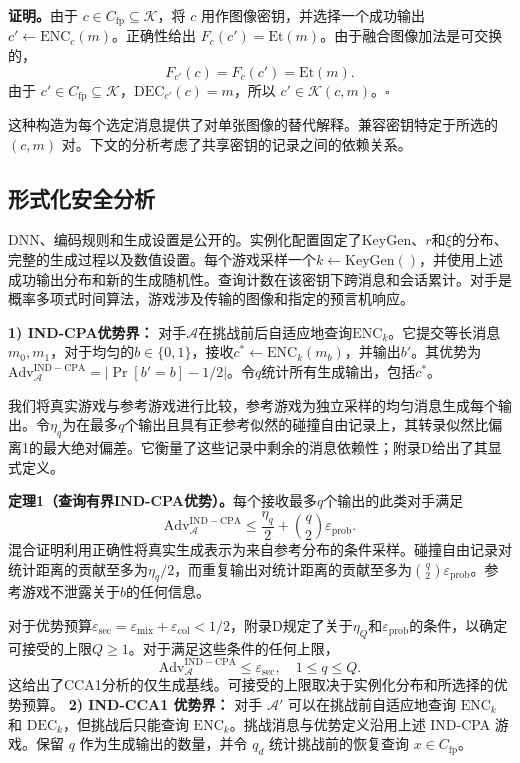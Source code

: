 \documentclass[UTF8,a4paper,zihao=-4,fontset=windows,openany]{ctexbook}
\begin{document}
\textbf{证明。}由于 \(c \in C_{\mathrm{fp}} \subseteq \mathcal{K}\)，将 \(c\) 用作图像密钥，并选择一个成功输出 \(c' \leftarrow \mathrm{ENC}_c(m)\)。正确性给出 \(F_c(c') = \mathrm{Et}(m)\)。由于融合图像加法是可交换的，
\begin{equation}
F_{c'}(c) = F_c(c') = \mathrm{Et}(m). \tag{16}
\end{equation}
由于 \(c' \in C_{\mathrm{fp}} \subseteq \mathcal{K}\)，\(\mathrm{DEC}_{c'}(c) = m\)，所以 \(c' \in \mathcal{K}(c, m)\)。\(\square\)

这种构造为每个选定消息提供了对单张图像的替代解释。兼容密钥特定于所选的 \((c, m)\) 对。下文的分析考虑了共享密钥的记录之间的依赖关系。
\subsection{形式化安全分析}

DNN、编码规则和生成设置是公开的。实例化配置固定了KeyGen、\(r\)和\(\xi\)的分布、完整的生成过程以及数值设置。每个游戏采样一个\(k \leftarrow \mathrm{KeyGen}()\)，并使用上述成功输出分布和新的生成随机性。查询计数在该密钥下跨消息和会话累计。对手是概率多项式时间算法，游戏涉及传输的图像和指定的预言机响应。

\textbf{1) IND-CPA优势界：} 对手\(\mathcal{A}\)在挑战前后自适应地查询\(\mathrm{ENC}_k\)。它提交等长消息\(m_0, m_1\)，对于均匀的\(b \in \{0,1\}\)，接收\(c^* \leftarrow \mathrm{ENC}_k(m_b)\)，并输出\(b'\)。其优势为\(\mathrm{Adv}_{\mathcal{A}}^{\mathrm{IND-CPA}} = |\Pr[b' = b] - 1/2|\)。令\(q\)统计所有生成输出，包括\(c^*\)。

我们将真实游戏与参考游戏进行比较，参考游戏为独立采样的均匀消息生成每个输出。令\(\eta_q\)为在最多\(q\)个输出且具有正参考似然的碰撞自由记录上，其转录似然比偏离1的最大绝对偏差。它衡量了这些记录中剩余的消息依赖性；附录D给出了其显式定义。

\textbf{定理1（查询有界IND-CPA优势）。}每个接收最多\(q\)个输出的此类对手满足
\begin{equation}
\mathrm{Adv}_{\mathcal{A}}^{\mathrm{IND-CPA}} \le \frac{\eta_q}{2} + \binom{q}{2} \varepsilon_{\mathrm{prob}}. \tag{17}
\end{equation}
混合证明利用正确性将真实生成表示为来自参考分布的条件采样。碰撞自由记录对统计距离的贡献至多为\(\eta_q/2\)，而重复输出对统计距离的贡献至多为\(\binom{q}{2}\varepsilon_{\mathrm{prob}}\)。参考游戏不泄露关于\(b\)的任何信息。

对于优势预算\(\varepsilon_{\mathrm{sec}} = \varepsilon_{\mathrm{mix}} + \varepsilon_{\mathrm{col}} < 1/2\)，附录D规定了关于\(\eta_Q\)和\(\varepsilon_{\mathrm{prob}}\)的条件，以确定可接受的上限\(Q \ge 1\)。对于满足这些条件的任何上限，
\begin{equation}
\mathrm{Adv}_{\mathcal{A}}^{\mathrm{IND-CPA}} \le \varepsilon_{\mathrm{sec}}, \quad 1 \le q \le Q. \tag{18}
\end{equation}
这给出了CCA1分析的仅生成基线。可接受的上限取决于实例化分布和所选择的优势预算。
\textbf{2) IND-CCA1 优势界：} 对手 \(\mathcal{A}'\) 可以在挑战前自适应地查询 \(\mathrm{ENC}_k\) 和 \(\mathrm{DEC}_k\)，但挑战后只能查询 \(\mathrm{ENC}_k\)。挑战消息与优势定义沿用上述 IND-CPA 游戏。保留 \(q\) 作为生成输出的数量，并令 \(q_d\) 统计挑战前的恢复查询 \(x \in C_{\mathrm{fp}}\)。
\end{document}
